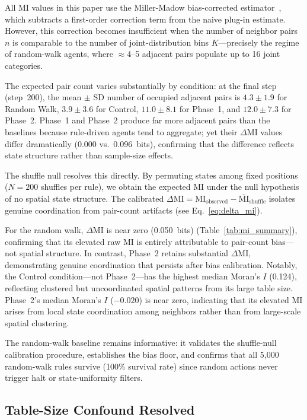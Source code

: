 \documentclass[letterpaper]{article}
\begin{document}
All MI values in this paper use the Miller-Madow bias-corrected
estimator~\citep{miller1955note}, which subtracts a first-order correction
term from the naive plug-in estimate. However, this correction becomes
insufficient when the number of neighbor pairs $n$ is comparable to the
number of joint-distribution bins $K$---precisely the regime of random-walk
agents, where $\approx$4--5 adjacent pairs populate up to 16 joint
categories.

The expected pair count varies substantially by condition: at the final step
(step~200), the mean $\pm$ SD number of occupied adjacent pairs is
$4.3 \pm 1.9$ for Random Walk, $3.9 \pm 3.6$ for Control,
$11.0 \pm 8.1$ for Phase~1, and $12.0 \pm 7.3$ for Phase~2.
Phase~1 and Phase~2 produce far more adjacent pairs than the baselines
because rule-driven agents tend to aggregate; yet their $\Delta\mathrm{MI}$
values differ dramatically (0.000 vs.\ 0.096~bits), confirming that the
difference reflects state structure rather than sample-size effects.

The shuffle null resolves this directly. By permuting states among fixed
positions ($N=200$ shuffles per rule), we obtain the expected MI under the
null hypothesis of no spatial state structure. The calibrated
$\Delta\mathrm{MI} = \mathrm{MI}_{\mathrm{observed}} -
\overline{\mathrm{MI}}_{\mathrm{shuffle}}$ isolates genuine coordination
from pair-count artifacts (see Eq.~\ref{eq:delta_mi}).

For the random walk, $\Delta\mathrm{MI}$ is near zero
(0.050~bits)
(Table~\ref{tab:mi_summary}), confirming that its elevated raw MI is
entirely attributable to pair-count bias---not spatial structure. In
contrast, Phase~2 retains substantial $\Delta\mathrm{MI}$, demonstrating genuine
coordination that persists after bias calibration. Notably, the Control
condition---not Phase~2---has the highest median Moran's $I$ (0.124),
reflecting clustered but uncoordinated spatial patterns from its large table
size. Phase~2's median Moran's $I$ ($-0.020$) is near zero, indicating that
its elevated MI arises from local state coordination among neighbors rather
than from large-scale spatial clustering.

The random-walk baseline remains informative: it validates the shuffle-null
calibration procedure, establishes the bias floor, and confirms that all
5{,}000 random-walk rules survive (100\% survival rate) since random
actions never trigger halt or state-uniformity filters.

\subsection{Table-Size Confound Resolved}
\end{document}
